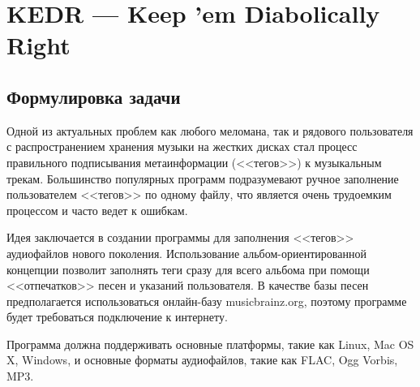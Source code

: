 \documentclass[a4paper,12pt,oneside]{article}
\begin{document}
\section*{KEDR --- Keep 'em Diabolically Right}
\subsection*{Формулировка задачи}

Одной из актуальных проблем как любого меломана, так и рядового
пользователя с распространением хранения музыки на жестких
дисках стал процесс правильного подписывания метаинформации (<<тегов>>) к
музыкальным трекам. Большинство популярных программ подразумевают ручное
заполнение пользователем <<тегов>> по одному файлу, что является очень
трудоемким процессом и часто ведет к ошибкам.

Идея заключается в создании программы для заполнения <<тегов>> аудиофайлов
нового поколения. Использование альбом-ориентированной концепции
позволит заполнять теги сразу для всего альбома при помощи
<<отпечатков>> песен и указаний пользователя. В качестве базы песен
предполагается использоваться онлайн-базу musicbrainz.org, поэтому
программе будет требоваться подключение к интернету.

Программа должна поддерживать основные платформы, такие как Linux, Mac OS X,
Windows, и основные форматы аудиофайлов, такие как FLAC, Ogg Vorbis,
MP3.
\end{document}
